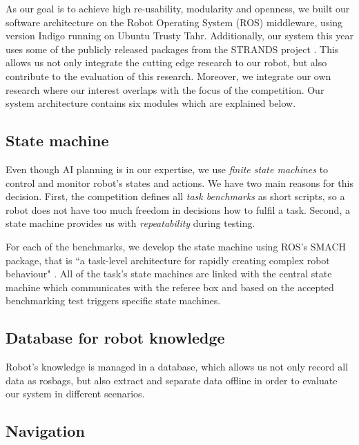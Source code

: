 As our goal is to achieve high re-usability, modularity and openness, we built our software architecture on the Robot Operating System (ROS) middleware, using version Indigo \cite{ros} running on Ubuntu Trusty Tahr. 
Additionally, our system this year uses some of the publicly released packages from the STRANDS project \cite{strands}. 
This allows us not only integrate the cutting edge research to our robot, but also contribute to the evaluation of this research. 
Moreover, we integrate our own research where our interest overlaps with the focus of the competition.
Our system architecture contains six modules which are explained below.

\subsection{State machine}

Even though AI planning is in our expertise, we use \textit{finite state machines} to control and monitor robot's states and actions. 
We have two main reasons for this decision. First, the competition defines all \textit{task benchmarks} as short scripts, so a robot does not have too much freedom in decisions how to fulfil a task. Second, a state machine provides us with \textit{repeatability} during testing.

For each of the benchmarks, we develop the state machine using ROS's SMACH package, that is ``a task-level architecture for rapidly creating complex robot behaviour" \cite{smach}. 
All of the task's state machines are linked with the central state machine which communicates with the referee box and based on the accepted benchmarking test triggers specific state machines. 


\subsection{Database for robot knowledge}

Robot's knowledge is managed in a database, which allows us not only record all data as rosbags, but also extract and separate data offline in order to evaluate our system in different scenarios. 

\subsection{Navigation}

